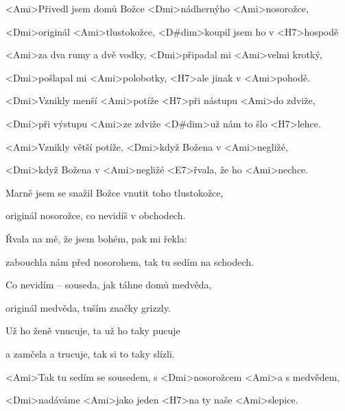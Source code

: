 

\zs
<Ami>Přivedl jsem domů Božce <Dmi>nádhernýho <Ami>nosorožce,

<Dmi>originál <Ami>tlustokožce, <D#dim>koupil jsem ho 
v <H7>hospodě

<Ami>za dva rumy a dvě vodky, <Dmi>připadal mi <Ami>velmi 
krotký,

<Dmi>pošlapal mi <Ami>polobotky, <H7>ale jinak v <Ami>pohodě.

<Dmi>Vznikly menší <Ami>potíže <H7>při nástupu <Ami>do zdviže,

<Dmi>při výstupu <Ami>ze zdviže <D#dim>už nám to šlo <H7>lehce.

<Ami>Vznikly větší potíže, <Dmi>když Božena v <Ami>negližé,

<Dmi>když Božena v <Ami>negližé <E7>řvala, že ho <Ami>nechce.
\ks

\zs
Marně jsem se snažil Božce vnutit toho tlustokožce,

originál nosorožce, co nevidíš v obchodech.

Řvala na mě, že jsem bohém, pak mi řekla: 

zabouchla nám před nosorohem, tak tu sedím na schodech.

Co nevidím -- souseda, jak táhne domů medvěda,

originál medvěda, tuším značky grizzly.

Už ho ženě vnucuje, ta už ho taky pucuje

a zamčela a trucuje, tak si to taky slízli.
\ks

\zs
<Ami>Tak tu sedím se sousedem, s <Dmi>nosorožcem <Ami>a s medvědem,

<Dmi>nadáváme <Ami>jako jeden <H7>na ty naše <Ami>slepice.
\ks

\kp


